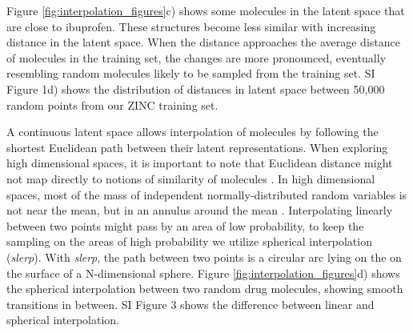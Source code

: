 \documentclass[journal=acscii,manuscript=article]{achemso}
\begin{document}
Figure \ref{fig:interpolation_figures}c) shows some molecules in the latent space that are close to ibuprofen. These structures become less similar with increasing distance in the latent space. When the distance approaches the average distance of molecules in the training set, the changes are more pronounced, eventually resembling random molecules likely to be sampled from the training set. SI Figure 1d) shows the distribution of distances in latent space between 50,000 random points from our ZINC training set. 

A continuous latent space allows interpolation of molecules by following the shortest Euclidean path between their latent representations. When exploring high dimensional spaces, it is important to note that Euclidean distance might not map directly to notions of similarity of molecules \cite{Aggarwal2001}. In high dimensional spaces, most of the mass of independent normally-distributed random variables is not near the mean, but in an annulus around the mean \cite{Domingos2012}. Interpolating linearly between two points might pass by an area of low probability, to keep the sampling on the areas of high probability we utilize spherical interpolation\cite{White2016} (\emph{slerp}). With \emph{slerp}, the path between two points is a circular arc lying on the on the surface of a N-dimensional sphere. Figure \ref{fig:interpolation_figures}d) shows the spherical interpolation between two random drug molecules, showing smooth transitions in between. SI Figure 3 shows the difference between linear and spherical interpolation.
\end{document}
